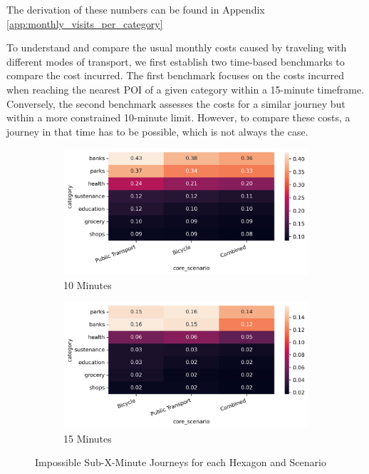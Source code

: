 The derivation of these numbers can be found in Appendix \ref{app:monthly_visits_per_category}

To understand and compare the usual monthly costs caused by traveling with different modes of transport, we first establish two time-based benchmarks to compare the cost incurred.
The first benchmark focuses on the costs incurred when reaching the nearest POI of a given category within a 15-minute timeframe. 
Conversely, the second benchmark assesses the costs for a similar journey but within a more constrained 10-minute limit.
However, to compare these costs, a journey in that time has to be possible, which is not always the case.


\begin{figure}
  \centering
  \begin{subfigure}[b]{0.45\textwidth}
    \centering
    \includegraphics[width=\textwidth]{Figures/results/monthly_costs/percentage_inf_10.png}
    \caption{10 Minutes}
    \label{fig:percentage_inf_10}
  \end{subfigure}
  \hfill
  \begin{subfigure}[b]{0.45\textwidth}
    \centering
    \includegraphics[width=\textwidth]{Figures/results/monthly_costs/percentage_inf_15.png}
    \caption{15 Minutes}
    \label{fig:percentage_inf_15}
  \end{subfigure}
  \caption{Impossible Sub-X-Minute Journeys for each Hexagon and Scenario}
  \label{fig:percentage_inf_x}
\end{figure}

